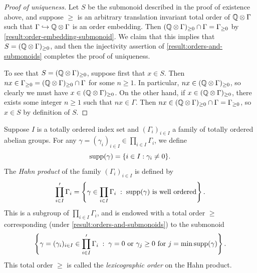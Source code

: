\begin{proof}[Proof of uniqueness]
Let $S$ be the submonoid described in the proof of existence above, and suppose $\geq$ is an arbitrary translation invariant total order of $\mathbb{Q} \otimes \Gamma$ such that $\Gamma \hookrightarrow \mathbb{Q} \otimes \Gamma$ is an order embedding. Then $(\mathbb{Q} \otimes \Gamma)_{\geq 0} \cap \Gamma = \Gamma_{\geq 0}$ by \cref{result:order-embedding-submonoid}. We claim that this implies that $S = (\mathbb{Q} \otimes \Gamma)_{\geq 0}$, and then the injectivity assertion of \cref{result:orders-and-submonoids} completes the proof of uniqueness. 

To see that $S = (\mathbb{Q} \otimes \Gamma)_{\geq 0}$, suppose first that $x \in S$. Then $nx \in \Gamma_{\geq 0} = (\mathbb{Q} \otimes \Gamma)_{\geq 0} \cap \Gamma$ for some $n \geq 1$. In particular, $nx \in (\mathbb{Q} \otimes \Gamma)_{\geq 0}$, so clearly we must have $x \in (\mathbb{Q} \otimes \Gamma)_{\geq 0}$. On the other hand, if $x \in (\mathbb{Q} \otimes \Gamma)_{\geq 0}$, there exists some integer $n \geq 1$ such that $nx \in \Gamma$. Then $nx \in (\mathbb{Q} \otimes \Gamma)_{\geq 0} \cap \Gamma = \Gamma_{\geq 0}$, so $x \in S$ by definition of $S$.
\end{proof}

\begin{example}
\label{example:hahn-product}
Suppose $I$ is a totally ordered index set and $(\Gamma_i)_{i \in I}$ a family of totally ordered abelian groups. For any $\gamma = (\gamma_i)_{i \in I} \in \prod_{i \in I} \Gamma_i$, we define 
\[ \operatorname{supp}(\gamma) = \{ i \in I : \gamma_i \neq 0 \}. \]
The \emph{Hahn product} of the family $(\Gamma_i)_{i \in I}$ is defined by
\[ \prod_{i \in I}' \Gamma_i = \left\{ \gamma \in \prod_{i \in I} \Gamma_i \; : \; \operatorname{supp}(\gamma) \text{ is well ordered} \right\}. \]
This is a subgroup of $\prod_{i \in I} \Gamma_i$, and is endowed with a total order $\geq$ corresponding (under \cref{result:orders-and-submonoids}) to the submonoid
\begin{equation} \label{eqn:hahn-product-order-cone} \left\{ \gamma = (\gamma_i)_{i \in I} \in \prod_{i \in I}' \Gamma_i \; : \; \gamma = 0 \text{ or } \gamma_{j} \geq 0 \text{ for } j = \min \operatorname{supp}(\gamma)  \right\}.
\end{equation}
This total order $\geq$ is called the \emph{lexicographic order} on the Hahn product.
\end{example}

